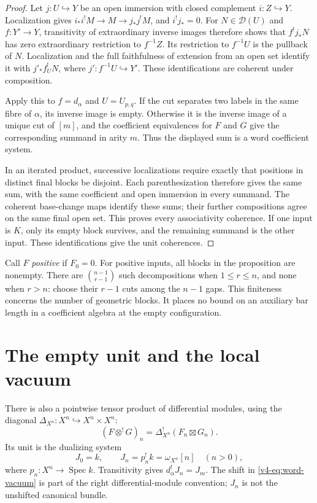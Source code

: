 \begin{proof}
Let \(j:U\hookrightarrow Y\) be an open immersion with closed
complement \(i:Z\hookrightarrow Y\). Localization gives
\(i_*i^!M\to M\to j_*j^!M\), and \(i^!j_*=0\).
For \(N\in\mathcal D(U)\) and \(f:Y'\to Y\), transitivity of
extraordinary inverse images
therefore shows that \(f^!j_*N\) has zero extraordinary restriction
to \(f^{-1}Z\). Its restriction to \(f^{-1}U\) is the pullback
of \(N\). Localization and the full faithfulness of extension
from an open set identify it with
\(j'_*f_U^!N\), where \(j':f^{-1}U\hookrightarrow Y'\).
These identifications are coherent under composition.

Apply this to \(f=d_\alpha\) and \(U=U_{p,q}\). If the cut
separates two labels in the same fibre of \(\alpha\), its inverse
image is empty. Otherwise it is the inverse image of a unique cut
of \([m]\), and the coefficient equivalences for \(F\) and \(G\)
give the corresponding summand in arity \(m\). Thus the displayed
sum is a word coefficient system.

In an iterated product, successive localizations require exactly
that positions in distinct final blocks be disjoint. Each
parenthesization therefore gives the same sum, with the same
coefficient and open immersion in every summand. The coherent
base-change maps identify these sums; their further compositions
agree on the same final open set. This proves every associativity
coherence. If one input is \(K\), only its empty block survives,
and the remaining summand is the other input. These identifications
give the unit coherences.
\end{proof}

Call \(F\) \emph{positive} if \(F_0=0\). For positive inputs,
all blocks in the proposition are nonempty. There are
\(\binom{n-1}{r-1}\) such decompositions when \(1\le r\le n\),
and none when \(r>n\): choose their \(r-1\) cuts among the
\(n-1\) gaps. This finiteness concerns the number of geometric
blocks. It places no bound on an auxiliary bar length in a
coefficient algebra at the empty configuration.

\section{The empty unit and the local vacuum}
\label{v4-sec:word-two-units}

There is also a pointwise tensor product of differential modules,
using the diagonal \(\Delta_{X^n}:X^n\hookrightarrow X^n\times X^n\):
\[
 (F\otimes^!G)_n=\Delta_{X^n}^!(F_n\boxtimes G_n).
\]
Its unit is the dualizing system
\begin{equation}\label{v4-eq:word-vacuum}
 J_0=k,\qquad J_n=p_n^!k=\omega_{X^n}[n]\quad(n>0),
\end{equation}
where \(p_n:X^n\to\operatorname{Spec}k\).
Transitivity gives \(d_\alpha^!J_n=J_m\). The shift in
\eqref{v4-eq:word-vacuum} is part of the right differential-module
convention; \(J_n\) is not the unshifted canonical bundle.

